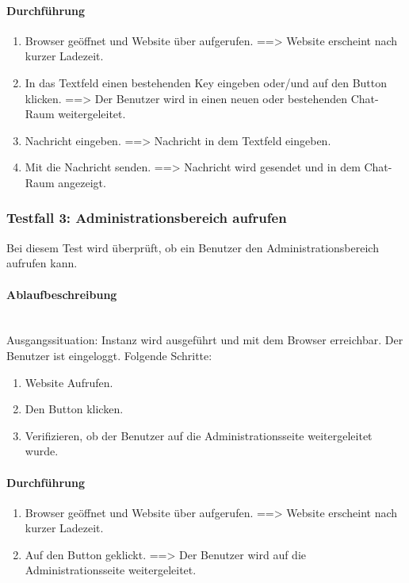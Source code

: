 \paragraph{Durchführung}
\begin{enumerate}
  \item Browser geöffnet und Website über  aufgerufen. \newline
  ==> Website erscheint nach kurzer Ladezeit.
  \item In das Textfeld  einen bestehenden Key eingeben oder/und auf den Button  klicken. \newline
  ==> Der Benutzer wird in einen neuen oder bestehenden Chat-Raum weitergeleitet.
  \item Nachricht eingeben. \newline
  ==> Nachricht in dem Textfeld  eingeben.
  \item Mit  die Nachricht senden. \newline
  ==> Nachricht wird gesendet und in dem Chat-Raum angezeigt.
\end{enumerate}

\subsubsection{Testfall 3: Administrationsbereich aufrufen}
Bei diesem Test wird überprüft, ob ein Benutzer den Administrationsbereich aufrufen kann.
\paragraph{Ablaufbeschreibung} \mbox{}\\
Ausgangssituation: Instanz wird ausgeführt und mit dem Browser erreichbar. Der Benutzer ist eingeloggt. Folgende Schritte: 
\begin{enumerate}
  \item Website Aufrufen.
  \item Den Button  klicken.
  \item Verifizieren, ob der Benutzer auf die Administrationsseite weitergeleitet wurde.
\end{enumerate}

\paragraph{Durchführung}
\begin{enumerate}
  \item Browser geöffnet und Website über  aufgerufen. \newline
  ==> Website erscheint nach kurzer Ladezeit.
  \item Auf den Button  geklickt. \newline
  ==> Der Benutzer wird auf die Administrationsseite weitergeleitet.
\end{enumerate}